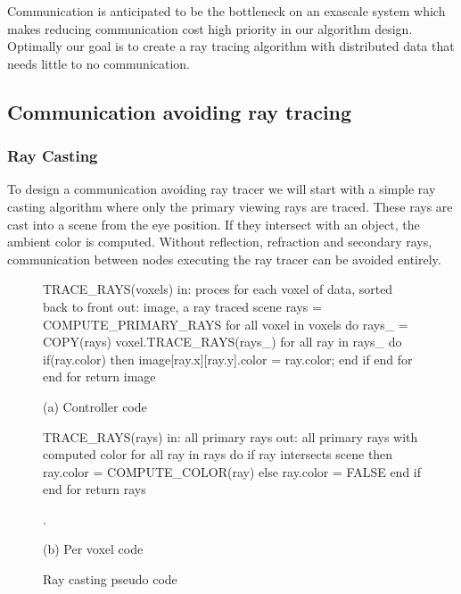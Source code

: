 Communication is anticipated to be the bottleneck on an exascale system which
makes reducing communication cost high priority in our algorithm design.  
Optimally our goal is to create a ray tracing algorithm with distributed data 
that needs little to no communication.

\subsection{Communication avoiding ray tracing}
\subsubsection{Ray Casting}
To design a communication avoiding ray tracer we will start with a simple ray
casting algorithm where only the primary viewing rays are traced. These rays are 
cast into a scene from the eye position.  If they intersect with an object, the 
ambient color is computed.  Without reflection, refraction and secondary rays,
communication between nodes executing the ray tracer can be avoided entirely.

\begin{figure}[!htb]
\begin{algorithm}
TRACE_RAYS(voxels) 
  in: proces for each voxel of 
      data, sorted back to front
  out: image, a ray traced scene
  rays = COMPUTE_PRIMARY_RAYS
  for all voxel in voxels do
  rays_ = COPY(rays)
    voxel.TRACE_RAYS(rays_)
    for all ray in rays_ do
      if(ray.color) then
        image[ray.x][ray.y].color
         = ray.color;
      end if
    end for
  end for
return image
\end{algorithm}

(a) Controller code

\endminipage\hfill
{}
\begin{algorithm}
TRACE_RAYS(rays)
  in:  all primary rays
  out: all primary rays with 
       computed color
  for all ray in rays do
    if ray intersects scene then
      ray.color = COMPUTE_COLOR(ray)
    else
      ray.color = FALSE
    end if
  end for
return rays



.
\end{algorithm}

(b) Per voxel code

\endminipage\hfill
\caption{Ray casting pseudo code}
\label{fig:ray_caster}
\end{figure}

